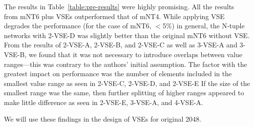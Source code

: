 
The results in Table~\ref{table:pre-results} were highly promising.
All the results from \textsf{mNT6} plus VSEs outperformed that of \textsf{mNT4}.
While applying VSE degrades the performance (for the case of \textsf{mNT6}, $<$5\%) in general, the N-tuple networks with 2-VSE-D was slightly better than the original \textsf{mNT6} without VSE.
From the results of 2-VSE-A, 2-VSE-B, and 2-VSE-C as well as 3-VSE-A and 3-VSE-B, we found that it was not necessary to introduce overlaps between value ranges---this was contrary to the authors' initial assumption.
The factor with the greatest impact on performance was the number of elements included in the smallest value range as seen in 2-VSE-C, 2-VSE-D, and 2-VSE-E
If the size of the smallest range was the same, then further splitting of higher ranges appeared to make little difference as seen in 2-VSE-E, 3-VSE-A, and 4-VSE-A.

We will use these findings in the design of VSEs for original 2048.


